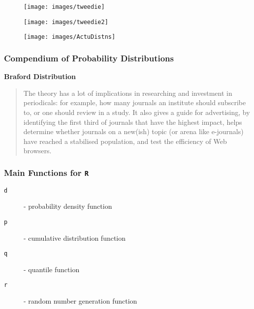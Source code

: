 \documentclass[MAIN.tex]{subfiles}
\begin{document}
\begin{frame}
	\begin{figure}
\centering
\texttt{[image: images/tweedie]}
\caption{}
\label{fig:tweedie}
\end{figure}

\end{frame}
\begin{frame}
	\begin{figure}
		\centering
		\texttt{[image: images/tweedie2]}

	\end{figure}
	
\end{frame}
\begin{frame}
	\begin{figure}
\centering
\texttt{[image: images/ActuDistns]}

\end{figure}

\end{frame}
\begin{frame}
	\frametitle{Compendium of Probability Distributions}
	\textbf{Braford Distribution}
\large
\begin{framed}
	\begin{quote}
	The theory has a lot of implications in researching and investment in periodicals: for example, how many journals an institute should subscribe to, or one should review in a study. It also gives a guide for advertising, by identifying the first third of journals that have the highest impact, helps determine whether journals on a new(ish) topic (or arena like e-journals) have reached a stabilised population, and test the efficiency of Web browsers.
\end{quote}
\end{framed}
\end{frame}

\begin{frame}
	\frametitle{Main Functions for \texttt{R}}
\begin{description}
\item[\texttt{d}] - probability density function
\item[\texttt{p}] - cumulative distribution function
\item[\texttt{q}] - quantile function
\item[\texttt{r}] - random number generation function
\end{description}

\end{frame}
\end{document}
